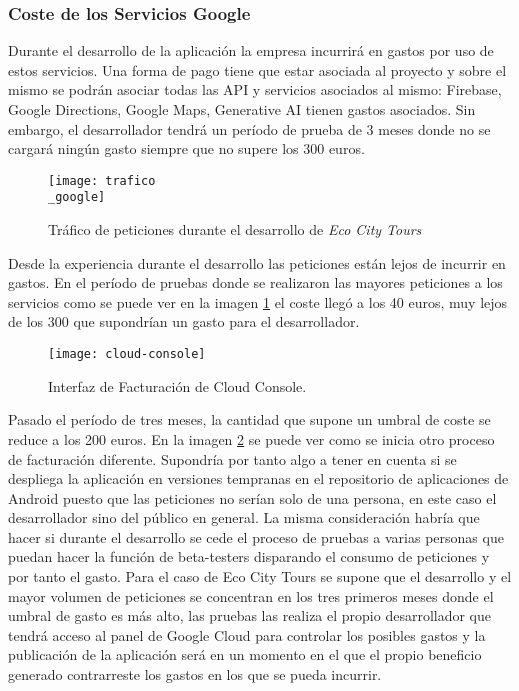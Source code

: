 \subsubsection{Coste de los Servicios Google}
Durante el desarrollo de la aplicación la empresa incurrirá en gastos por uso de estos servicios. Una forma de pago tiene que estar asociada al proyecto y sobre el mismo se podrán asociar todas las API y servicios asociados al mismo: Firebase, Google Directions, Google Maps, Generative AI tienen gastos asociados. Sin embargo, el desarrollador tendrá un período de prueba de 3 meses donde no se cargará ningún gasto siempre que no supere los 300 euros. 
\begin{figure}[h!]
	\centering
	\texttt{[image: trafico\\\_google]} %
	\caption{Tráfico de peticiones durante el desarrollo de \textit{Eco City Tours}} %
	\label{fig:trafico_google} %
\end{figure}

Desde la experiencia durante el desarrollo las peticiones están lejos de incurrir en gastos. En el período de pruebas donde se realizaron las mayores peticiones a los servicios como se puede ver en la imagen \ref{fig:trafico_google} el coste llegó a los 40 euros, muy lejos de los 300 que supondrían un gasto para el desarrollador.

\begin{figure}[h!]
	\centering
	\texttt{[image: cloud-console]} %
	\caption{Interfaz de Facturación de Cloud Console.} %
	\label{fig:cloud_console} %
\end{figure}

Pasado el período de tres meses, la cantidad que supone un umbral de coste se reduce a los 200 euros. En la imagen \ref{fig:cloud_console} se puede ver como se inicia otro proceso de facturación diferente. Supondría por tanto algo a tener en cuenta si se despliega la aplicación en versiones tempranas en el repositorio de aplicaciones de Android puesto que las peticiones no serían solo de una persona, en este caso el desarrollador sino del público en general. La misma consideración habría que hacer si durante el desarrollo se cede el proceso de pruebas a varias personas que puedan hacer la función de beta-testers disparando el consumo de peticiones y por tanto el gasto.
Para el caso de Eco City Tours se supone que el desarrollo y el mayor volumen de peticiones se concentran en los tres primeros meses donde el umbral de gasto es más alto, las pruebas las realiza el propio desarrollador que tendrá acceso al panel de Google Cloud para controlar los posibles gastos y la publicación de la aplicación será en un momento en el que el propio beneficio generado contrarreste los gastos en los que se pueda incurrir.
